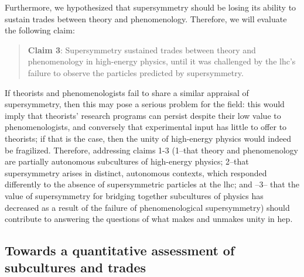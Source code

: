 \documentclass[smallextended]{svjour3}
\begin{document}
Furthermore, we hypothesized that supersymmetry should be losing its ability to sustain trades between theory and phenomenology. Therefore, we will evaluate the following claim:
 
\begin{quote}
    \textbf{Claim 3}: Supersymmetry sustained trades between theory and phenomenology in high-energy physics, until it was challenged by the \gls{lhc}'s failure to observe the particles predicted by supersymmetry.
\end{quote}

If theorists and phenomenologists fail to share a similar appraisal of supersymmetry, then this may pose a serious problem for the field: this would imply that theorists' research programs can persist despite their low value to phenomenologists, and conversely that experimental input has little to offer to theorists; if that is the case, then the unity of high-energy physics would indeed be fragilized. Therefore, addressing  claims 1-3 (1--that theory and phenomenology are partially autonomous subcultures of high-energy physics; 2--that supersymmetry arises in distinct, autonomous contexts, which responded differently to the absence of supersymmetric particles at the \gls{lhc}; and --3-- that the value of supersymmetry for bridging together subcultures of physics has decreased as a result of the failure of phenomenological supersymmetry) should contribute to answering the questions of what makes and unmakes unity in \gls{hep}.%

\subsection{Towards a quantitative assessment of subcultures and trades}
\label{section:quantitative}
\end{document}

